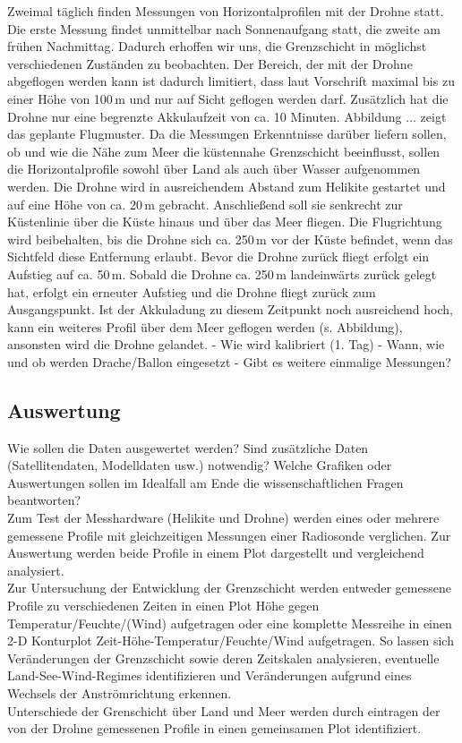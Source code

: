 \documentclass[a4paper,11pt,DIV=calc,tablecaptionabove,headinclude,twoside]{article}
\begin{document}
Zweimal täglich finden Messungen von Horizontalprofilen mit der Drohne statt. Die erste Messung findet unmittelbar nach Sonnenaufgang statt, die zweite am frühen Nachmittag. Dadurch erhoffen wir uns, die Grenzschicht in möglichst verschiedenen Zuständen zu beobachten.  
Der Bereich, der mit der Drohne abgeflogen werden kann ist dadurch limitiert, dass laut Vorschrift maximal bis zu einer Höhe von 100\,m und nur auf Sicht geflogen werden darf. Zusätzlich hat die Drohne nur eine begrenzte Akkulaufzeit von ca. 10 Minuten. Abbildung ... zeigt das geplante Flugmuster. Da die Messungen Erkenntnisse darüber liefern sollen, ob und wie die Nähe zum Meer die küstennahe Grenzschicht beeinflusst, sollen die Horizontalprofile sowohl über Land als auch über Wasser aufgenommen werden.
Die Drohne wird in ausreichendem Abstand zum Helikite gestartet und auf eine Höhe von ca. 20\,m gebracht. Anschließend soll sie senkrecht zur Küstenlinie über die Küste hinaus und über das Meer fliegen. Die Flugrichtung wird beibehalten, bis die Drohne sich ca. 250\,m vor der Küste befindet, wenn das Sichtfeld diese Entfernung erlaubt. Bevor die Drohne zurück fliegt erfolgt ein Aufstieg auf ca. 50\,m. Sobald die Drohne ca. 250\,m landeinwärts zurück gelegt hat, erfolgt ein erneuter Aufstieg und die Drohne fliegt zurück zum Ausgangspunkt. Ist der Akkuladung zu diesem Zeitpunkt noch ausreichend hoch, kann ein weiteres Profil über dem Meer geflogen werden (s. Abbildung), ansonsten wird die Drohne gelandet.   
- Wie wird kalibriert (1. Tag)
- Wann, wie und ob werden Drache/Ballon eingesetzt
- Gibt es weitere einmalige Messungen?

\subsection{Auswertung}
Wie sollen die Daten ausgewertet werden? Sind zusätzliche Daten (Satellitendaten, Modelldaten usw.) notwendig? Welche Grafiken oder Auswertungen sollen im Idealfall am Ende die wissenschaftlichen Fragen beantworten?\\

Zum Test der Messhardware (Helikite und Drohne) werden eines oder mehrere gemessene Profile 
mit gleichzeitigen Messungen einer Radiosonde verglichen. Zur Auswertung werden beide Profile
in einem Plot dargestellt und vergleichend analysiert.\\
Zur Untersuchung der Entwicklung der Grenzschicht werden entweder gemessene Profile zu verschiedenen 
Zeiten in einen Plot Höhe gegen Temperatur/Feuchte/(Wind) aufgetragen oder eine komplette Messreihe in einen 
2-D Konturplot Zeit-Höhe-Temperatur/Feuchte/Wind aufgetragen. So lassen sich Veränderungen der Grenzschicht sowie
deren Zeitskalen analysieren, eventuelle Land-See-Wind-Regimes identifizieren und Veränderungen aufgrund eines 
Wechsels der Anströmrichtung erkennen.\\
Unterschiede der Grenschicht über Land und Meer werden durch eintragen der von der Drohne gemessenen Profile 
in einen gemeinsamen Plot identifiziert.\\
\end{document}
